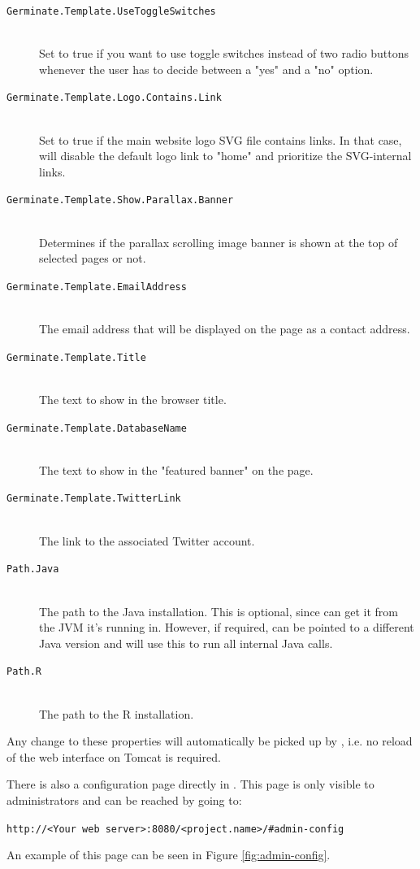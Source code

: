\begin{description}
    \item[\texttt{Germinate.Template.UseToggleSwitches}] \\Set to true if you want to use toggle switches instead of two radio buttons whenever the user has to decide between a "yes" and a "no" option.
    \item[\texttt{Germinate.Template.Logo.Contains.Link}] \\Set to true if the main website logo SVG file contains links. In that case, {\germinate} will disable the default logo link to "home" and prioritize the SVG-internal links.
    \item[\texttt{Germinate.Template.Show.Parallax.Banner}] \\Determines if the parallax scrolling image banner is shown at the top of selected pages or not.
    \item[\texttt{Germinate.Template.EmailAddress}] \floatright{[E-Mail]}\\The email address that will be displayed on the page as a contact address.    
    \item[\texttt{Germinate.Template.Title}] \floatright{[String]}\\The text to show in the browser title.
    \item[\texttt{Germinate.Template.DatabaseName}] \floatright{[String]}\\The text to show in the "featured banner" on the page.
    \item[\texttt{Germinate.Template.TwitterLink}] \floatright{[URL]}\\The link to the associated Twitter account.
    \item[\texttt{Path.Java}] \floatright{[String]}\\The path to the Java installation. This is optional, since {\germinate} can get it from the JVM it's running in. However, if required, {\germinate} can be pointed to a different Java version and will use this to run all internal Java calls.
    \item[\texttt{Path.R}\nonoptionalif] \floatright{[String]}\\The path to the R installation.
\end{description}
\noindent
Any change to these properties will automatically be picked up by {\germinate}, i.e. no reload of the web interface on Tomcat is required.

There is also a configuration page directly in {\germinate}. This page is only visible to administrators and can be reached by going to:
\begin{center}
	\texttt{http://<Your web server>:8080/<project.name>/\#admin-config}
\end{center}
\noindent An example of this page can be seen in Figure \ref{fig:admin-config}.

